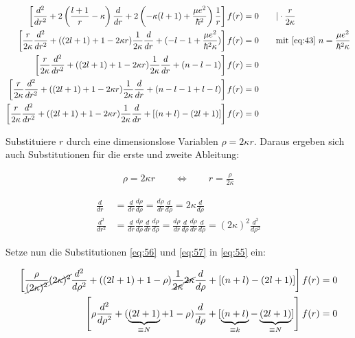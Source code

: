 \begin{align}
  \left[ \frac{d^2}{dr^2} + 2\left(\frac{l+1}{r}-\kappa\right)\frac{d}{dr} + 2 \left(-\kappa (l+1) + \frac{\mu e^2}{\hbar^2}\right) \frac{1}{r}  \right] f(r)&= 0 \qquad | \cdot \frac{r}{2\kappa} \\
\left[  \frac{r}{2\kappa} \frac{d^2}{dr^2} + ((2l+1)+1-2\kappa r)\frac{1}{2\kappa}\frac{d}{dr} + (-l-1+\frac{\mu e^2}{\hbar^2 \kappa})  \right] f(r)&= 0 \qquad \text{mit \eqref{eq:43} } n = \frac{\mu e^2}{\hbar^2 \kappa} \\
\left[ \frac{r}{2\kappa} \frac{d^2}{dr^2} + ((2l+1)+1-2\kappa r)\frac{1}{2\kappa}\frac{d}{dr} + (n-l-1)  \right] f(r)&= 0 \\
\left[ \frac{r}{2\kappa} \frac{d^2}{dr^2} + ((2l+1)+1-2\kappa r)\frac{1}{2\kappa}\frac{d}{dr} + (n-l-1+l-l)  \right] f(r)&= 0 \\
\left[ \frac{r}{2\kappa} \frac{d^2}{dr^2} + ((2l+1)+1-2\kappa r)\frac{1}{2\kappa}\frac{d}{dr} + [(n+l)-(2l+1)]  \right] f(r)&= 0 \\
 \label{eq:55}
\end{align}

Substituiere \(r\) durch eine dimensionslose Variablen \(\rho = 2\kappa r\). Daraus ergeben sich auch Substitutionen für die erste und zweite Ableitung:

\begin{align}
  \label{eq:56}
  \rho = 2\kappa r \qquad \Leftrightarrow \qquad r = \frac{\rho}{2\kappa} 
\end{align}

\begin{align}
  \label{eq:57}
  \frac{d}{dr} &= \frac{d}{dr}\frac{d\rho}{d\rho} = \frac{d\rho}{dr}\frac{d}{d\rho} = 2\kappa \frac{d}{d\rho} \\
  \frac{d^2}{dr^2} &= \frac{d}{dr}\frac{d\rho}{d\rho} \frac{d}{dr}\frac{d\rho}{d\rho}= \frac{d\rho}{dr}\frac{d}{d\rho}\frac{d\rho}{dr}\frac{d}{d\rho} = (2\kappa)^2 \frac{d^2}{d\rho^2}
\end{align}

Setze nun die Substitutionen \eqref{eq:56} und \eqref{eq:57} in \eqref{eq:55} ein:

\begin{align}
  \label{eq:58}
  \left[ \frac{\rho}{\cancel{(2\kappa)^2}}\cancel{(2\kappa)^2} \frac{d^2}{d\rho^2}   + ((2l+1)+1-\rho)\frac{1}{\cancel{2\kappa}}\cancel{2\kappa} \frac{d}{d\rho}  + [(n+l)-(2l+1)]  \right] f(r)&= 0\\
  \left[ \rho \frac{d^2}{d\rho^2}   + (\underbrace{(2l+1)}_{\equiv N}+1-\rho)\frac{d}{d\rho}  + [\underbrace{(n+l)}_{\equiv k}-\underbrace{(2l+1)}_{\equiv N}]  \right] f(r)&= 0
\end{align}

